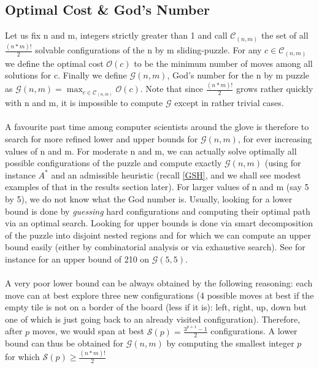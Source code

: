 \subsection{Optimal Cost \& God's Number}

Let us fix n and m, integers strictly greater than 1 and call $\mathcal{C}_{(n, m)}$ the set of all $\frac{(n * m)!}{2}$ solvable configurations of the n by m sliding-puzzle. For any $c \in \mathcal{C}_{(n, m)}$ we define the optimal cost $\mathcal{O}(c)$ to be the minimum number of moves among all solutions for c. Finally we define $\mathcal{G}(n, m)$, God's number for the n by m puzzle as  $\mathcal{G}(n, m) = \max_{c \in \mathcal{C}_{(n, m)}} \mathcal{O}(c)$. Note that since $\frac{(n * m)!}{2}$ grows rather quickly with n and m, it is impossible to compute $\mathcal{G}$ except in rather trivial cases.
\\
\\
A favourite past time among computer scientists around the glove is therefore to search for more refined lower and upper bounds for $\mathcal{G}(n, m)$, for ever increasing values of n and m. For moderate n and m, we can actually solve optimally all possible configurations of the puzzle and compute exactly $\mathcal{G}(n, m)$  (using for instance $A^{*}$ and an admissible heuristic (recall \ref{GSH}, and we shall see modest examples of that in the results section later). For larger values of n and m (say 5 by 5), we do not know what the God number is. Usually, looking for a lower bound is done by \textit{guessing} hard configurations and computing their optimal path via an optimal search. Looking for upper bounds is done via smart decomposition of the puzzle into disjoint nested regions and for which we can compute an upper bound easily (either by combinatorial analysis or via exhaustive search). See for instance \cite{KarlemoOstergard} for an upper bound of 210 on $\mathcal{G}(5, 5)$.
\\
\\
A very poor lower bound can be always obtained by the following reasoning: each move can at best explore three new configurations (4 possible moves at best if the empty tile is not on a border of the board (less if it is): left, right, up, down but one of which is just going back to an already visited configuration). Therefore, after $p$ moves, we would span at best $\mathcal{S}(p) = \frac{3^{p+1} - 1}{2}$ configurations. A lower bound can thus be obtained for $\mathcal{G}(n, m)$ by computing the smallest integer $p$ for which $\mathcal{S}(p) \ge \frac{(n * m)!}{2}$


